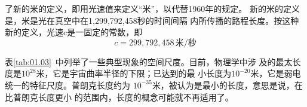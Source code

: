 \noindent 了新的米的定义，即用光速值来定义“米”，以代替1960年的规定。
新的米的定义是，米是光在真空中在1,299,792,458秒的时间间隔
内所传播的路程长度。按这种新的定义，光速c是一固定的常数，即
\begin{equation*}
  c = 299,792,458 \, \text{米/秒}
\end{equation*}

表\ref{tab:01.03}~中列举了一些典型现象的空间尺度。目前，物理学中涉
及的最太长度是$10^{28}$米，它是宇宙曲率半径的下限；已达到的最
小长度为$10^{-20}$米，它是弱电统一的特征尺度。普朗克长度约为
$10^{-35}$米，被认为是最小的长度，意思是说，在比普朗克长度更小
的范围内，长度的概念可能就不再适用了。
